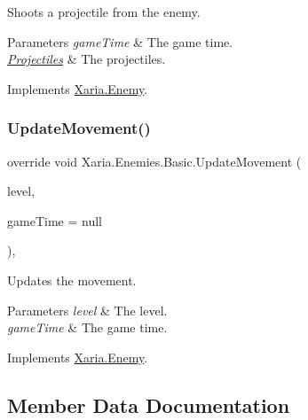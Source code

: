 Shoots a projectile from the enemy. 


\begin{DoxyParams}{Parameters}
{\em game\+Time} & The game time.\\
\hline
{\em \hyperlink{namespaceXaria_1_1Projectiles}{Projectiles}} & The projectiles.\\
\hline
\end{DoxyParams}


Implements \hyperlink{classXaria_1_1Enemy_a229b595e96e1429a9e9b1d9816d4370b}{Xaria.\+Enemy}.

\mbox{\label{classXaria_1_1Enemies_1_1Basic_a1f8c20016b8ea5c18fca1295510952c9}} 
\subsubsection{\texorpdfstring{Update\+Movement()}{UpdateMovement()}}
{\footnotesize\ttfamily override void Xaria.\+Enemies.\+Basic.\+Update\+Movement (\begin{DoxyParamCaption}\item[{\hyperlink{classXaria_1_1Level}{Level}}]{level,  }\item[{Game\+Time}]{game\+Time = {\ttfamily null} }\end{DoxyParamCaption})\hspace{0.3cm}{\ttfamily [inline]}, {\ttfamily [virtual]}}



Updates the movement. 


\begin{DoxyParams}{Parameters}
{\em level} & The level.\\
\hline
{\em game\+Time} & The game time.\\
\hline
\end{DoxyParams}


Implements \hyperlink{classXaria_1_1Enemy_abe1058263c5512b5e098e73d3b6d704c}{Xaria.\+Enemy}.



\subsection{Member Data Documentation}
\mbox{\label{classXaria_1_1Enemies_1_1Basic_aaf2e0ae06d49fceedf17fbe8b1549fc8}} 
